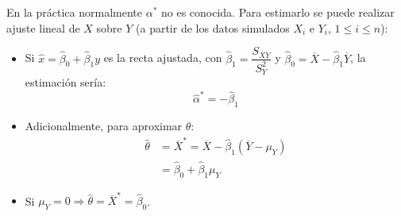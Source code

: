 \documentclass[
  10pt,
]{book}
\theoremstyle{break}
\theoremstyle{nonumberplain}
\begin{document}
En la práctica normalmente \(\alpha^{\ast}\) no es conocida.
Para estimarlo se puede realizar ajuste lineal de \(X\) sobre \(Y\)
(a partir de los datos simulados \(X_{i}\) e \(Y_{i}\), \(1\leq i\leq n\)):

\begin{itemize}
\item
  Si \(\hat{x}=\hat{\beta}_{0}+\hat{\beta}_{1}y\) es la recta ajustada, con
  \(\hat{\beta}_{1} = \dfrac{S_{XY}}{S_{Y}^{2}}\) y
  \(\hat{\beta}_{0} = \overline{X}-\hat{\beta}_{1}\overline{Y}\),
  la estimación sería:
  \[\hat{\alpha}^{\ast}=-\hat{\beta}_{1}\]
\item
  Adicionalmente, para aproximar \(\theta\):
  \[\begin{aligned}
  \hat{\theta} & =\overline{X}^{\ast}=\overline{X}-\hat{\beta}_{1}\left( \overline{Y}-\mu_{Y}\right) \\  
  & =\hat{\beta}_{0}+\hat{\beta}_{1}\mu_{Y}
  \end{aligned}\]
\item
  Si \(\mu_{Y}=0\Rightarrow \hat{\theta}=\overline{X}^{\ast}=\hat{\beta}_{0}\).
\end{itemize}
\end{document}
